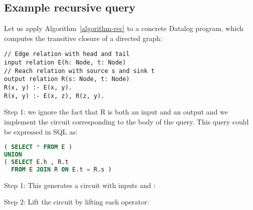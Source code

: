 \subsection{Example recursive query}\label{sec:recursive-example}

Let us apply Algorithm~\ref{algorithm-rec} to a concrete Datalog
program, which computes the transitive closure of a directed graph:

\begin{lstlisting}[language=ddlog,basicstyle=\small\ttfamily]
// Edge relation with head and tail
input relation E(h: Node, t: Node)
// Reach relation with source s and sink t
output relation R(s: Node, t: Node)
R(x, y) :- E(x, y).
R(x, y) :- E(x, z), R(z, y).
\end{lstlisting}

Step 1: we ignore the fact that R is both an input and an output and we implement
the \dbsp circuit corresponding to the body of the query.  This query could be expressed
in SQL as:

\begin{lstlisting}[language=SQL,basicstyle=\small\ttfamily]
( SELECT * FROM E )
UNION
( SELECT E.h , R.t
  FROM E JOIN R ON E.t = R.s )
\end{lstlisting}

\noindent Step 1:
This generates a circuit with inputs  and :


\noindent Step 2: Lift the circuit by lifting each operator:


